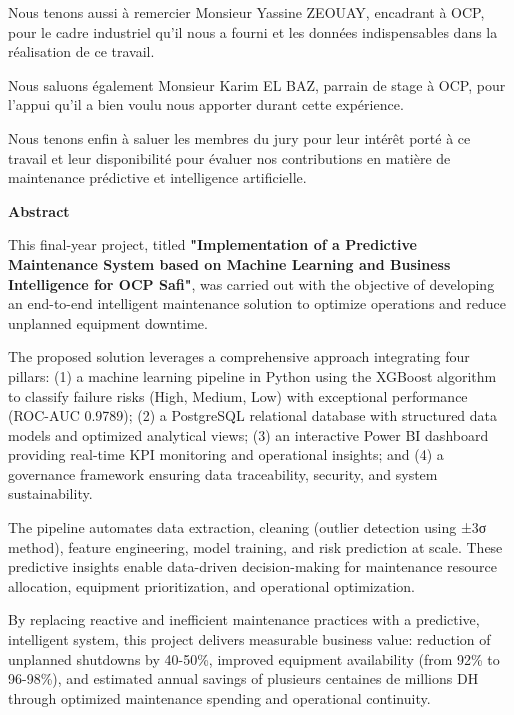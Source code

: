 \documentclass[a4paper,12pt]{report}
\begin{document}
Nous tenons aussi à remercier Monsieur Yassine ZEOUAY, encadrant à OCP, pour le cadre industriel qu’il nous a fourni et les données indispensables dans la réalisation de ce travail.

Nous saluons également Monsieur Karim EL BAZ, parrain de stage à OCP, pour l’appui qu’il a bien voulu nous apporter durant cette expérience.

Nous tenons enfin à saluer les membres du jury pour leur intérêt porté à ce travail et leur disponibilité pour évaluer nos contributions en matière de maintenance prédictive et intelligence artificielle.


\newpage
\thispagestyle{empty}
\begin{center}
\Large\textbf{Abstract}
\end{center}

\vspace{2cm}

This final-year project, titled \textbf{"Implementation of a Predictive Maintenance System based on Machine Learning and Business Intelligence for OCP Safi"}, was carried out with the objective of developing an end-to-end intelligent maintenance solution to optimize operations and reduce unplanned equipment downtime.

The proposed solution leverages a comprehensive approach integrating four pillars: (1) a machine learning pipeline in Python using the XGBoost algorithm to classify failure risks (High, Medium, Low) with exceptional performance (ROC-AUC 0.9789); (2) a PostgreSQL relational database with structured data models and optimized analytical views; (3) an interactive Power BI dashboard providing real-time KPI monitoring and operational insights; and (4) a governance framework ensuring data traceability, security, and system sustainability.

The pipeline automates data extraction, cleaning (outlier detection using ±3σ method), feature engineering, model training, and risk prediction at scale. These predictive insights enable data-driven decision-making for maintenance resource allocation, equipment prioritization, and operational optimization.

By replacing reactive and inefficient maintenance practices with a predictive, intelligent system, this project delivers measurable business value: reduction of unplanned shutdowns by 40-50\%, improved equipment availability (from 92\% to 96-98\%), and estimated annual savings of plusieurs centaines de millions DH through optimized maintenance spending and operational continuity.
\end{document}
